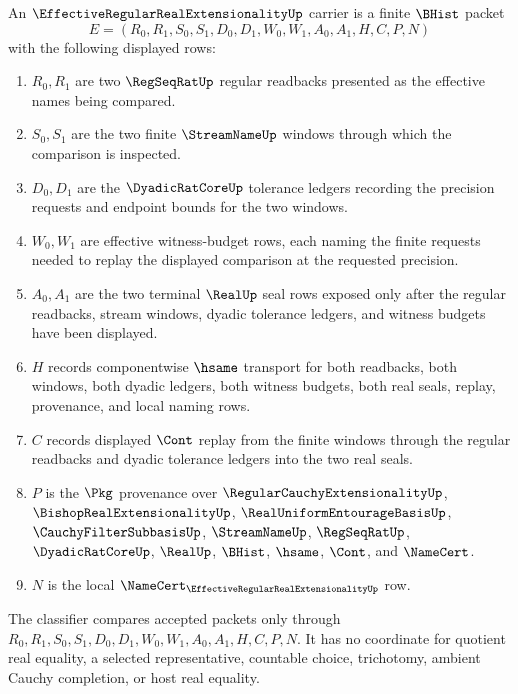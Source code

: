 \begin{definition}
\label{def:effective-regular-real-extensionality-carrier}
An $\EffectiveRegularRealExtensionalityUp$ carrier is a finite $\BHist$ packet
$$
E=(R_0,R_1,S_0,S_1,D_0,D_1,W_0,W_1,A_0,A_1,H,C,P,N)
$$
with the following displayed rows:
\begin{enumerate}
\item $R_0,R_1$ are two $\RegSeqRatUp$ regular readbacks presented as the effective names being compared.
\item $S_0,S_1$ are the two finite $\StreamNameUp$ windows through which the comparison is inspected.
\item $D_0,D_1$ are the $\DyadicRatCoreUp$ tolerance ledgers recording the precision requests and endpoint bounds for the two windows.
\item $W_0,W_1$ are effective witness-budget rows, each naming the finite requests needed to replay the displayed comparison at the requested precision.
\item $A_0,A_1$ are the two terminal $\RealUp$ seal rows exposed only after the regular readbacks, stream windows, dyadic tolerance ledgers, and witness budgets have been displayed.
\item $H$ records componentwise $\hsame$ transport for both readbacks, both windows, both dyadic ledgers, both witness budgets, both real seals, replay, provenance, and local naming rows.
\item $C$ records displayed $\Cont$ replay from the finite windows through the regular readbacks and dyadic tolerance ledgers into the two real seals.
\item $P$ is the $\Pkg$ provenance over $\RegularCauchyExtensionalityUp$, $\BishopRealExtensionalityUp$, $\RealUniformEntourageBasisUp$, $\CauchyFilterSubbasisUp$, $\StreamNameUp$, $\RegSeqRatUp$, $\DyadicRatCoreUp$, $\RealUp$, $\BHist$, $\hsame$, $\Cont$, and $\NameCert$.
\item $N$ is the local $\NameCert_{\EffectiveRegularRealExtensionalityUp}$ row.
\end{enumerate}
The classifier compares accepted packets only through $R_0,R_1,S_0,S_1,D_0,D_1,W_0,W_1,A_0,A_1,H,C,P,N$. It has no coordinate for quotient real equality, a selected representative, countable choice, trichotomy, ambient Cauchy completion, or host real equality.
\end{definition}

